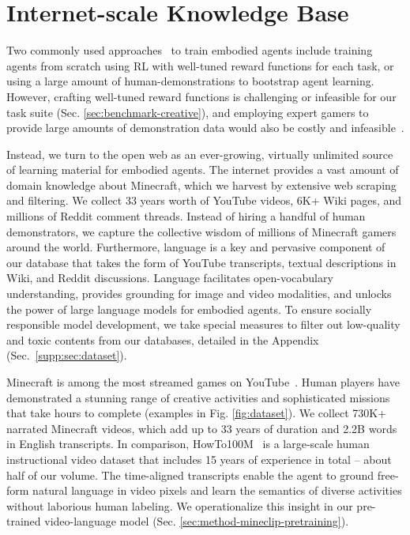 
\section{Internet-scale Knowledge Base}
\label{sec:dataset}


Two commonly used approaches~\cite{silver2017mastering, vinyals2019alphastar, openai2019dota, DBLP:journals/ral/FuchsSKSD21} to train embodied agents include training agents from scratch using RL with well-tuned reward functions for each task, or using a large amount of human-demonstrations to bootstrap agent learning. However, crafting well-tuned reward functions is challenging or infeasible for our task suite (Sec. \ref{sec:benchmark-creative}), and employing expert gamers to provide large amounts of demonstration data would also be costly and infeasible~\cite{vinyals2019alphastar}.

Instead, we turn to the open web as an ever-growing, virtually unlimited source of learning material for embodied agents. The internet provides a vast amount of domain knowledge about Minecraft, which we harvest by extensive web scraping and filtering. We collect 33 years worth of YouTube videos, 6K+ Wiki pages, and millions of Reddit comment threads.  
Instead of hiring a handful of human demonstrators, we capture the collective wisdom of millions of Minecraft gamers around the world. Furthermore, language is a key and pervasive component of our database that takes the form of YouTube transcripts, textual descriptions in Wiki, and Reddit discussions. Language facilitates open-vocabulary understanding, provides grounding for image and video modalities, and unlocks the power of large language models \cite{devlin2018bert,shoeybi2019megatron,brown2020gpt3} for embodied agents. To ensure socially responsible model development, we take special measures to filter out low-quality and toxic contents \cite{bommasani2021foundation,detoxify} from our databases, detailed in the Appendix (Sec.~\ref{supp:sec:dataset}).

Minecraft is among the most streamed games on YouTube~\cite{gerblick_2021}. Human players have demonstrated a stunning range of creative activities and sophisticated missions that take hours to complete (examples in Fig. \ref{fig:dataset}). We collect 730K+ narrated Minecraft videos, which add up to 33 years of duration and 2.2B words in English transcripts. 
In comparison, HowTo100M~\cite{miech2019howto100m} is a large-scale human instructional video dataset that includes 15 years of experience in total -- about half of our volume. The time-aligned transcripts enable the agent to ground free-form natural language in video pixels and learn the semantics of diverse activities without laborious human labeling. We operationalize this insight in our pre-trained video-language model (Sec. \ref{sec:method-mineclip-pretraining}). 

